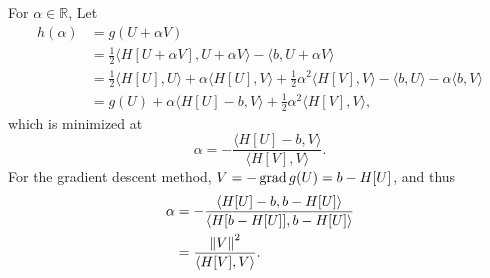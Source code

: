 \documentclass[en, oneside]{assignment}
\begin{document}
\begin{sol}
\begin{enumerate}[label=(\arabic*)]
        For $\alpha \in \mathbb{R}$, Let
        \begin{align*}
            h(\alpha) &= g(U + \alpha V)\\
            &= \frac{1}{2}\langle H [U + \alpha V], U + \alpha V \rangle - \langle b, U + \alpha V \rangle\\
            &= \frac{1}{2}\langle H [U], U \rangle + \alpha \langle H [U], V \rangle + \frac{1}{2}\alpha^2 \langle H [V], V \rangle - \langle b, U \rangle - \alpha \langle b, V \rangle\\
            &= g(U) + \alpha \langle H [U] - b, V \rangle + \frac{1}{2}\alpha^2 \langle H [V], V \rangle,
        \end{align*}
        which is minimized at
        \begin{equation*}
            \alpha = -\frac{\langle H [U] - b, V \rangle}{\langle H [V], V \rangle}.
        \end{equation*}
        For the gradient descent method, $V = -\operatorname{grad} g(U) = b - H [U]$, and thus
        \begin{align*}
            \alpha &= - \frac{\langle H [U] - b, b - H [U] \rangle}{\langle H [b - H [U]], b - H [U] \rangle}\\
            &= \frac{\left\lVert V\right\rVert^2}{\langle H [V], V \rangle}.
        \end{align*}
    \end{enumerate}
\end{sol}
\end{document}
